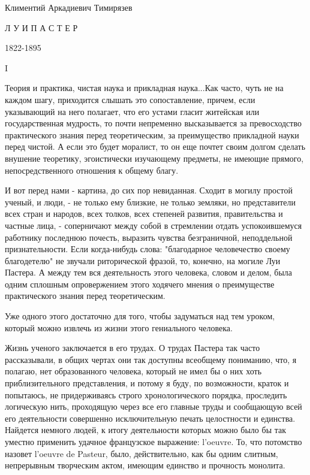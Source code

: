 Климентий Аркадиевич Тимирязев


Л У И     П А С Т Е Р

1822-1895

I

Теория и практика, чистая наука и прикладная наука...Как часто, чуть  не
на каждом  шагу,  приходится  слышать это  сопоставление,  причем,  если
указывающий на  него  полагает,  что его  устами  гласит  житейская  или
государственная  мудрость,   то   почти  непременно   высказывается   за
превосходство практического знания перед теоретическим, за  преимущество
прикладной науки перед  чистой. А  если это  будет моралист,  то он  еще
почтет своим долгом сделать внушение теоретику, эгоистически  изучающему
предметы, не  имеющие  прямого,  непосредственного  отношения  к  общему
благу.

И вот  перед нами  - картина,  до сих  пор невиданная.  Сходит в  могилу
простой ученый, и люди, - не  только ему близкие, не только земляки,  но
представители всех стран и народов, всех толков, всех степеней развития,
правительства и частные  лица, -  соперничают между  собой в  стремлении
отдать успокоившемуся  работнику  последнюю  почесть,  выразить  чувства
безграничной, неподдельной  признательности.  Если  когда-нибудь  слова:
"благодарное человечество  своему благодетелю"  не звучали  риторической
фразой, то, конечно, на могиле Луи Пастера. А между тем вся деятельность
этого человека, словом и делом, была одним сплошным опровержением  этого
ходячего мнения о преимуществе практического знания перед теоретическим.

Уже одного этого достаточно для  того, чтобы задуматься над тем  уроком,
который можно извлечь из жизни этого гениального человека.

Жизнь ученого  заключается в  его  трудах. О  трудах Пастера  так  часто
рассказывали, в общих чертах они так доступны всеобщему пониманию,  что,
я полагаю, нет  образованного человека, который  не имел бы  о них  хоть
приблизительного представления, и потому я буду, по возможности,  краток
и  попытаюсь,   не   придерживаясь  строго   хронологического   порядка,
проследить логическую нить,  проходящую через  все его  главные труды  и
сообщающую  всей  его  деятельности  совершенно  исключительную   печать
целостности и  единства. Найдется  немного людей,  к итогу  деятельности
которых  можно  было  бы  так  уместно  применить  удачное   французское
выражение: l'oeuvre.  То, что  потомство  назовет l'oeuvre  de  Pasteur,
было, действительно, как бы одним слитным, непрерывным творческим актом,
имеющим единство и прочность монолита.


